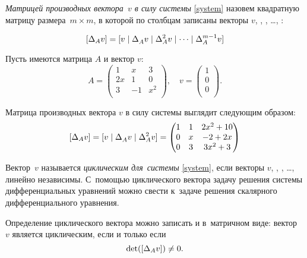 \newpage
\emph{Матрицей производных вектора~$v$ в силу системы} \eqref{system} назовем квадратную матрицу размера~$m \times m$,
в которой по столбцам записаны векторы $v$, \diffVector, \diffVector[2], \dots, \diffVector[m-1]:

\begin{equation}
	\diffMatrix = [v \mid \diffVector \mid \diffVector[2] \mid \dots \mid \diffVector[m-1]]
    \label{diffMatrix}
\end{equation}

\begin{example}
	Пусть имеются матрица $A$ и вектор $v$:
	\begin{equation*}
		A = 
		\begin{pmatrix}
			1 & x & 3 \\
			2x & 1 & 0 \\
			3 & -1 & x^2 \\
		\end{pmatrix},\quad
		v =
		\begin{pmatrix}
			1 \\
			0 \\
			0 \\
		\end{pmatrix}.
	\end{equation*}
    
	Матрица производных вектора $v$ в силу системы выглядит следующим образом:
	\begin{equation*}
		\diffMatrix = [v \mid \diffVector \mid \diffVector[2]] = 
		\begin{pmatrix}
			1 & 1 & 2x^2 + 10 \\
			0 & x & -2 + 2x \\
			0 & 3 & 3x^2 + 3 \\
		\end{pmatrix}
	\end{equation*}
\end{example}

Вектор~$v$ называется \emph{циклическим для~системы} \eqref{system}, если векторы $v$, \diffVector, \diffVector[2], \dots, \diffVector[m-1] линейно независимы.
С~помощью циклического вектора задачу решения системы дифференциальных уравнений можно свести к~задаче решения скалярного дифференциального уравнения.

Определение циклического вектора можно записать и в~матричном виде:
вектор~$v$ является циклическим, если и только если
\begin{equation*}
	\dett(\diffMatrix) \neq 0.
\end{equation*}
